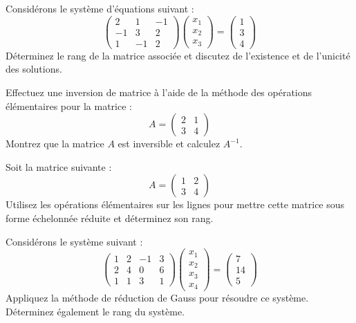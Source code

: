 \begin{exercice}
Considérons le système d'équations suivant :
\[
\begin{pmatrix}
2 & 1 & -1 \\
-1 & 3 & 2 \\
1 & -1 & 2
\end{pmatrix}
\begin{pmatrix}
x_1 \\
x_2 \\
x_3
\end{pmatrix} = 
\begin{pmatrix}
1 \\
3 \\
4
\end{pmatrix}
\]
Déterminez le rang de la matrice associée et discutez de l'existence et de l'unicité des solutions.
\end{exercice}

\begin{exercice}
Effectuez une inversion de matrice à l'aide de la méthode des opérations élémentaires pour la matrice :
\[
A = \begin{pmatrix}
2 & 1 \\
3 & 4
\end{pmatrix}
\]
Montrez que la matrice \( A \) est inversible et calculez \( A^{-1} \).
\end{exercice}

\begin{exercice}
Soit la matrice suivante :
\[
A = \begin{pmatrix}
1 & 2 \\
3 & 4
\end{pmatrix}
\]
Utilisez les opérations élémentaires sur les lignes pour mettre cette matrice sous forme échelonnée réduite et déterminez son rang.
\end{exercice}

\begin{exercice}
Considérons le système suivant :
\[
\begin{pmatrix}
1 & 2 & -1 & 3 \\
2 & 4 & 0 & 6 \\
1 & 1 & 3 & 1
\end{pmatrix}
\begin{pmatrix}
x_1 \\
x_2 \\
x_3 \\
x_4
\end{pmatrix} = 
\begin{pmatrix}
7 \\
14 \\
5
\end{pmatrix}
\]
Appliquez la méthode de réduction de Gauss pour résoudre ce système. Déterminez également le rang du système.
\end{exercice}
